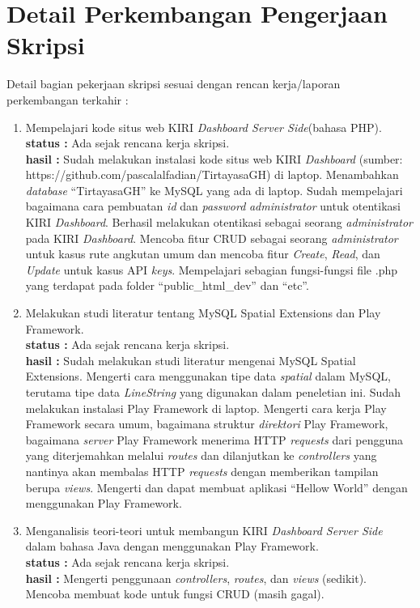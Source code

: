 \documentclass[a4paper,twoside]{article}
\begin{document}
\section{Detail Perkembangan Pengerjaan Skripsi}
Detail bagian pekerjaan skripsi sesuai dengan rencan kerja/laporan perkembangan terkahir :
	\begin{enumerate}
		\item Mempelajari kode situs web KIRI \textit{Dashboard Server Side}(bahasa PHP).\\
		{\bf status :} Ada sejak rencana kerja skripsi.\\
		{\bf hasil :} Sudah melakukan instalasi kode situs web KIRI \textit{Dashboard} (sumber: https://github.com/pascalalfadian/TirtayasaGH) di laptop. Menambahkan \textit{database} ``TirtayasaGH'' ke MySQL yang ada di laptop. Sudah mempelajari bagaimana cara pembuatan \textit{id} dan \textit{password} \textit{administrator} untuk otentikasi KIRI \textit{Dashboard}. Berhasil melakukan otentikasi sebagai seorang \textit{administrator} pada KIRI \textit{Dashboard}. Mencoba fitur CRUD sebagai seorang \textit{administrator} untuk kasus rute angkutan umum dan mencoba fitur \textit{Create}, \textit{Read}, dan \textit{Update} untuk kasus API \textit{keys}. Mempelajari sebagian fungsi-fungsi file .php yang terdapat pada folder ``public\_html\_dev'' dan ``etc''. 
		
		\item Melakukan studi literatur tentang MySQL Spatial Extensions dan Play Framework.\\
		{\bf status :} Ada sejak rencana kerja skripsi.\\
		{\bf hasil :} Sudah melakukan studi literatur mengenai MySQL Spatial Extensions. Mengerti cara menggunakan tipe data \textit{spatial} dalam MySQL, terutama tipe data \textit{LineString} yang digunakan dalam peneletian ini. Sudah melakukan instalasi Play Framework di laptop. Mengerti cara kerja Play Framework secara umum, bagaimana struktur \textit{direktori} Play Framework,  bagaimana \textit{server} Play Framework menerima HTTP \textit{requests} dari pengguna yang diterjemahkan melalui \textit{routes} dan dilanjutkan ke \textit{controllers} yang nantinya akan membalas HTTP \textit{requests} dengan memberikan tampilan berupa \textit{views}. Mengerti dan dapat membuat aplikasi ``Hellow World'' dengan menggunakan Play Framework.

		\item Menganalisis teori-teori untuk membangun KIRI \textit{Dashboard Server Side} dalam bahasa Java dengan menggunakan Play Framework.\\
		{\bf status :} Ada sejak rencana kerja skripsi.\\
		{\bf hasil :} Mengerti penggunaan \textit{controllers}, \textit{routes}, dan \textit{views} (sedikit). Mencoba membuat kode untuk fungsi CRUD (masih gagal).


\end{enumerate}
\end{document}
